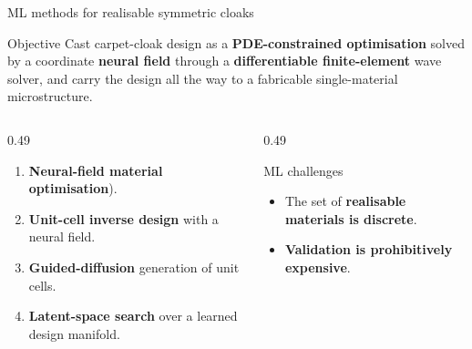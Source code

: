 \documentclass[aspectratio=169, 10pt]{beamer}
\newcommand{\takeaway}[1]{%
  \vspace{0.3em}%
  \begin{beamercolorbox}[wd=\textwidth, rounded=true, sep=6pt]{block body alerted}
    \small\textbf{\textcolor{ASTRAorange}{\ding{228}\ Takeaway.}}~#1
  \end{beamercolorbox}}
\begin{document}
\begin{frame}{ML methods for realisable symmetric cloaks}
  \begin{block}{Objective}
    Cast carpet-cloak design as a \textbf{PDE-constrained optimisation} solved
    by a coordinate \textbf{neural field} through a \textbf{differentiable
    finite-element} wave solver, and carry the design all the way to a
    fabricable single-material microstructure.
  \end{block}
  \vspace{0.2em}
  \begin{columns}[T]
    \begin{column}{0.49\textwidth}
      \begin{enumerate}\footnotesize
        \item[\ding{202}] \textbf{Neural-field material optimisation}).
        \item[\ding{203}] \textbf{Unit-cell inverse design} with a neural field.
        \item[\ding{204}] \textbf{Guided-diffusion} generation of unit cells.
        \item[\ding{205}] \textbf{Latent-space search} over a learned design manifold.
      \end{enumerate}
    \end{column}
    \begin{column}{0.49\textwidth}
      \begin{block}{ML challenges}
        \begin{itemize}\footnotesize
          \item The set of \textbf{realisable materials is discrete}.
          \item \textbf{Validation is prohibitively expensive}.
        \end{itemize}
      \end{block}
      \vspace{0.2em}
    \end{column}
  \end{columns}
\end{frame}


\end{document}

